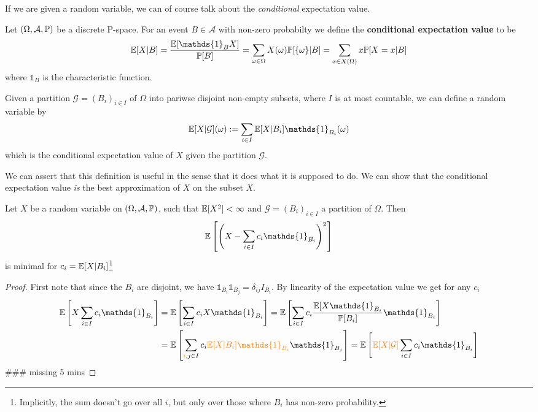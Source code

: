 If we are given a random variable, we can of course talk about the \emph{conditional} expectation value.
\begin{dfn}[]
  Let $(\Omega,\mathcal{A},\mathbb{P})$ be a discrete P-space. For an event $B \in \mathcal{A}$ with non-zero probabilty we define the \textbf{conditional expectation value} to be
  \begin{align*}
    \E[X|B] = \frac{\E[\mathds{1}_B X]}{\IP[B]} = \sum_{\omega \in \Omega}X(\omega) \IP[\{\omega\}|B] = \sum_{x \in X(\Omega)} x\IP[X = x|B]
  \end{align*} 
  where $\mathds{1}_{B}$ is the characteristic function.


  Given a partition $\mathcal{G} = (B_i)_{i \in I}$ of $\Omega$ into pariwse disjoint non-empty subsets, where $I$ is at most countable, we can define a random variable by
  \begin{align*}
    \E[X|\mathcal{G}](\omega) := \sum_{i \in I}\E[X|B_i]\mathds{1}_{B_i}(\omega)
  \end{align*}
  which is the conditional expectation value of $X$ given the partition $\mathcal{G}$.
\end{dfn}
We can assert that this definition is useful in the sense that it does what it is supposed to do. 
We can show that the conditional expectation value \emph{is} the best approximation of $X$ on the subset $X$.

\begin{thm}[]
  Let $X$ be a random variable on $(\Omega,\mathcal{A},\mathbb{P})$,  such that $\mathbb{E}[X^{2}] < \infty$ and $\mathcal{G} = (B_i)_{i \in I}$ a partition of $\Omega$. Then
  \begin{align*}
    \E \left[
      \left(
        X - \sum_{i \in I}c_i \mathds{1}_{B_i}
      \right)^2
    \right]
  \end{align*}
  is minimal for $c_i = \mathbb{E}[X|B_i]$\footnote{
    Implicitly, the sum doesn't go over all $i$, but only over those where $B_i$ has non-zero probability.
}
\end{thm}
\begin{proof}
  First note that since the $B_i$ are disjoint, we have $\mathds{1}_{B_i}\mathds{1}_{B_j} = \delta_{ij} I_{B_i}$.
  By linearity of the expectation value we get for any $c_i$
  \begin{align*}
    \E \left[
      X \sum_{i\in I}c_i \mathds{1}_{B_i}
    \right]
    &=
    \E \left[
      \sum_{i \in I}c_i X \mathds{1}_{B_i}
    \right] 
    =
    \E \left[
      \sum_{i \in I}c_i \frac{\E[X \mathds{1}_{B_{i}}}{\IP[B_i]} \mathds{1}_{B_i}
    \right]
    \\
    &=
    \E \left[
      \sum_{{\color{orange}i},j \in I}c_i {\color{orange}\E[X|B_i] \mathds{1}_{B_i}} \mathds{1}_{B_j}
    \right]
    =
    \E \left[
      {\color{orange}
      \E[X|\mathcal{G}]}\sum_{i \in I}c_i \mathds{1}_{B_i}
    \right]
  \end{align*}
  \#\#\# missing 5 mins

\end{proof}


